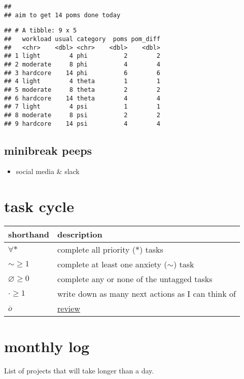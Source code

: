 \documentclass[]{book}
\providecommand{\tightlist}{%
  \setlength{\itemsep}{0pt}\setlength{\parskip}{0pt}}
\begin{document}
\begin{verbatim}
## 
## aim to get 14 poms done today
\end{verbatim}

\begin{verbatim}
## # A tibble: 9 x 5
##   workload usual category  poms pom_diff
##   <chr>    <dbl> <chr>    <dbl>    <dbl>
## 1 light        4 phi          2        2
## 2 moderate     8 phi          4        4
## 3 hardcore    14 phi          6        6
## 4 light        4 theta        1        1
## 5 moderate     8 theta        2        2
## 6 hardcore    14 theta        4        4
## 7 light        4 psi          1        1
## 8 moderate     8 psi          2        2
## 9 hardcore    14 psi          4        4
\end{verbatim}

\hypertarget{minibreak-peeps}{%
\subsection{minibreak peeps}\label{minibreak-peeps}}

\begin{itemize}
\tightlist
\item
  social media \& slack
\end{itemize}

\hypertarget{task-cycle}{%
\section{task cycle}\label{task-cycle}}

\begin{longtable}[]{@{}ll@{}}
\toprule
shorthand & description\tabularnewline
\midrule
\endhead
\(\forall *\) & complete all priority (\(*\)) tasks\tabularnewline
\(\sim \geqslant 1\) & complete at least one anxiety (\(\sim\)) task\tabularnewline
\(\varnothing \geqslant 0\) & complete any or none of the untagged tasks\tabularnewline
\(\cdot \geqslant 1\) & write down as many next actions as I can think of\tabularnewline
\(\overline o\) & \protect\hyperlink{review}{review}\tabularnewline
\bottomrule
\end{longtable}

\hypertarget{monthly-log}{%
\section{monthly log}\label{monthly-log}}

List of projects that will take longer than a day.
\end{document}
